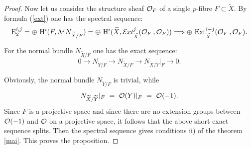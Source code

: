 \documentclass[12pt]{article}
\def\o#1{{\cal O}_{#1}}
\begin{document}
\begin{proof}
Now let us consider the structure sheaf ${\cal O}_F$ of a single $p$-fibre $F\subset {\widetilde X}$. By formula (\ref{ext}) one has the spectral sequence:
$$
{\rm E}^{i,j}_2=\oplus \ {\rm H}^i(F, \Lambda ^jN_{{\widetilde X}/F})=\oplus \ {\rm H}^i({\widetilde X},{\cal E}xt^j_{\widetilde X}({\o F}\:, {\o F}))\Longrightarrow \oplus \ 
{\rm Ext}^{i+j}_{\widetilde X}({\o F}\:, {\o F}).
$$

For the normal bundle $N_{{\widetilde X}/F}$ one has the exact sequence:
$$
0\to N_{{\widetilde Y}/F}\to N_{{\widetilde X}/F}\to N_{{\widetilde X}/{\widetilde Y}}|_F\to 0.
$$

Obviously, the normal bundle $N_{{\widetilde Y}/F}$ is trivial, while
$$
N_{{\widetilde X}/{\widetilde Y}}|_F\ =\ {\cal O}(Y)|_F\ =\ {\cal O}(-1).
$$
Since $F$ is a projective space and since there are no extension groups between ${\cal O}(-1)$ and ${\cal O}$ on a projective space, it follows that the above short exact sequence splits. Then the spectral sequence gives conditions ii) of the theorem \ref{mai}. This proves the proposition.
\end{proof}
\end{document}
